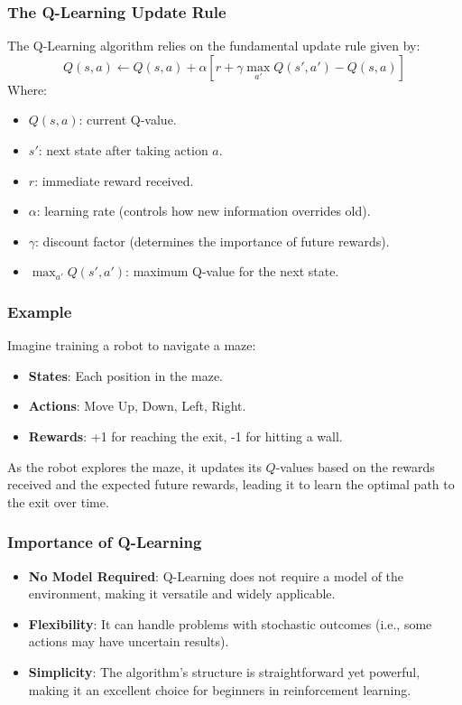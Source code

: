 \documentclass[aspectratio=169]{beamer}
\begin{document}
\begin{frame}[fragile]
    \frametitle{The Q-Learning Update Rule}
    The Q-Learning algorithm relies on the fundamental update rule given by:
    \begin{equation}
    Q(s, a) \leftarrow Q(s, a) + \alpha [r + \gamma \max_{a'} Q(s', a') - Q(s, a)]
    \end{equation}
    Where:
    \begin{itemize}
        \item $Q(s, a)$: current Q-value.
        \item $s'$: next state after taking action $a$.
        \item $r$: immediate reward received.
        \item $\alpha$: learning rate (controls how new information overrides old).
        \item $\gamma$: discount factor (determines the importance of future rewards).
        \item $\max_{a'} Q(s', a')$: maximum Q-value for the next state.
    \end{itemize}
\end{frame}

\begin{frame}[fragile]
    \frametitle{Example}
    Imagine training a robot to navigate a maze:
    \begin{itemize}
        \item \textbf{States}: Each position in the maze.
        \item \textbf{Actions}: Move Up, Down, Left, Right.
        \item \textbf{Rewards}: +1 for reaching the exit, -1 for hitting a wall.
    \end{itemize}
    As the robot explores the maze, it updates its $Q$-values based on the rewards received and the expected future rewards, leading it to learn the optimal path to the exit over time.
\end{frame}

\begin{frame}[fragile]
    \frametitle{Importance of Q-Learning}
    \begin{itemize}
        \item \textbf{No Model Required}: Q-Learning does not require a model of the environment, making it versatile and widely applicable.
        \item \textbf{Flexibility}: It can handle problems with stochastic outcomes (i.e., some actions may have uncertain results).
        \item \textbf{Simplicity}: The algorithm's structure is straightforward yet powerful, making it an excellent choice for beginners in reinforcement learning.
    \end{itemize}
\end{frame}
\end{document}
